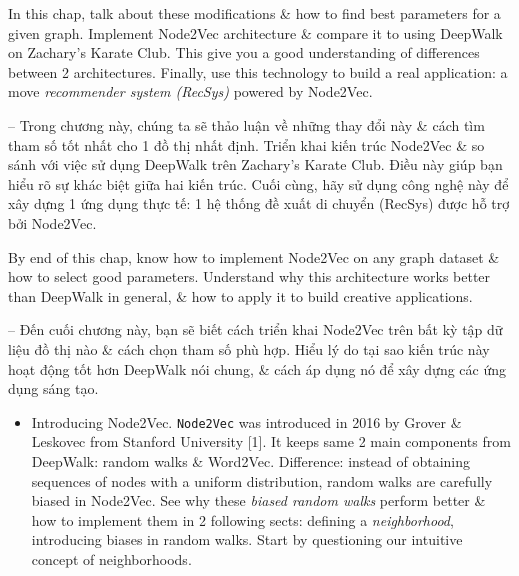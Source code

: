 \documentclass{article}
\begin{document}
\begin{itemize}
    In this chap, talk about these modifications \& how to find best parameters for a given graph. Implement Node2Vec architecture \& compare it to using DeepWalk on Zachary's Karate Club. This give you a good understanding of differences between 2 architectures. Finally, use this technology to build a real application: a move {\it recommender system (RecSys)} powered by Node2Vec.

    -- Trong chương này, chúng ta sẽ thảo luận về những thay đổi này \& cách tìm tham số tốt nhất cho 1 đồ thị nhất định. Triển khai kiến trúc Node2Vec \& so sánh với việc sử dụng DeepWalk trên Zachary's Karate Club. Điều này giúp bạn hiểu rõ sự khác biệt giữa hai kiến trúc. Cuối cùng, hãy sử dụng công nghệ này để xây dựng 1 ứng dụng thực tế: 1 hệ thống đề xuất di chuyển (RecSys) được hỗ trợ bởi Node2Vec.

    By end of this chap, know how to implement Node2Vec on any graph dataset \& how to select good parameters. Understand why this architecture works better than DeepWalk in general, \& how to apply it to build creative applications.

    -- Đến cuối chương này, bạn sẽ biết cách triển khai Node2Vec trên bất kỳ tập dữ liệu đồ thị nào \& cách chọn tham số phù hợp. Hiểu lý do tại sao kiến trúc này hoạt động tốt hơn DeepWalk nói chung, \& cách áp dụng nó để xây dựng các ứng dụng sáng tạo.
    \begin{itemize}
        \item {\sf Introducing Node2Vec.} {\tt Node2Vec} was introduced in 2016 by {\sc Grover \& Leskovec} from Stanford University [1]. It keeps same 2 main components from DeepWalk: random walks \& Word2Vec. Difference: instead of obtaining sequences of nodes with a uniform distribution, random walks are carefully biased in Node2Vec. See why these {\it biased random walks} perform better \& how to implement them in 2 following sects: defining a {\it neighborhood}, introducing biases in random walks. Start by questioning our intuitive concept of neighborhoods.


\end{itemize}
\end{itemize}
\end{document}
